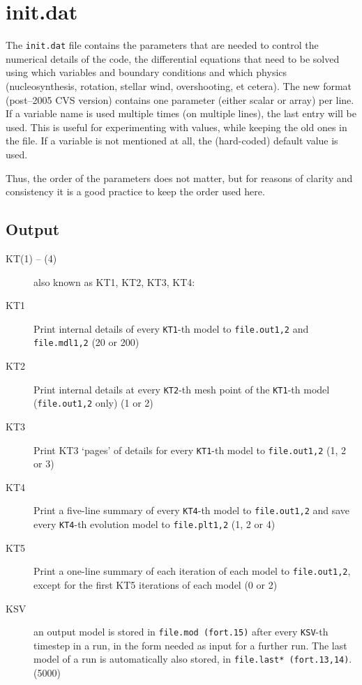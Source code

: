 \hypertarget{initdat}{}
\section{init.dat}
\label{sec:initdat}

The \texttt{init.dat} file contains the parameters that are needed to control
the numerical details of the code, the differential equations that need to be
solved using which variables and boundary conditions and which physics (nucleosynthesis,
rotation, stellar wind, overshooting, et cetera).  The new format (post--2005 CVS version)
contains one parameter (either scalar or array) per line.  If a variable name
is used multiple times (on multiple lines), the last entry will be used.  This 
is useful for experimenting with values, while keeping the old ones in the file.
If a variable is not mentioned at all, the (hard-coded) default value is used.

Thus, the order of the parameters does not matter, but for reasons of clarity and
consistency it is a good practice to keep the order used here.



\subsection{Output}
\label{sec:initdat:output}
\begin{description}
\item[KT(1) -- (4)] also known as KT1, KT2, KT3, KT4:
\item[KT1]\hypertarget{kt1}{} Print internal details of every \texttt{KT1}-th model to \texttt{file.out1,2} and \texttt{file.mdl1,2} (20 or 200)
\item[KT2]\hypertarget{kt2}{} Print internal details at every \texttt{KT2}-th mesh point of the \texttt{KT1}-th model (\texttt{file.out1,2} only) (1 or 2)
\item[KT3]\hypertarget{kt3}{} Print KT3 `pages' of details for every \texttt{KT1}-th model to \texttt{file.out1,2} (1, 2 or 3)
\item[KT4]\hypertarget{kt4}{} Print a five-line summary of every \texttt{KT4}-th model to \texttt{file.out1,2} and save every \texttt{KT4}-th evolution model to \texttt{file.plt1,2} (1, 2 or 4) 
\item[KT5]\hypertarget{kt5}{} Print a one-line summary of each iteration of each model to \texttt{file.out1,2}, except for the first KT5 iterations of each model  (0 or 2)
\item[KSV]\hypertarget{ksv}{} an output model is stored in \texttt{file.mod (fort.15)} after every \texttt{KSV}-th timestep in a run, in the form needed as input for a 
  further run. The last model of a run is automatically also stored, in \texttt{file.last* (fort.13,14)}. (5000)
\end{description}


